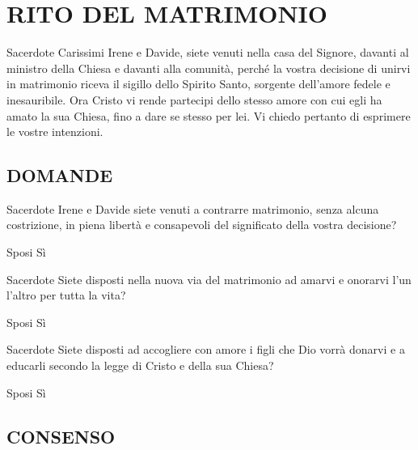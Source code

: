 
\section*{RITO DEL MATRIMONIO}

\begin{dialoghi}
\item[Sacerdote] Carissimi Irene e Davide, siete venuti nella casa del Signore, davanti al ministro della Chiesa e davanti alla comunità, perché la vostra decisione di unirvi in matrimonio riceva il sigillo dello Spirito Santo, sorgente dell'amore fedele e inesauribile. Ora Cristo vi rende partecipi dello stesso amore con cui egli ha amato la sua Chiesa, fino a dare se stesso per lei. Vi chiedo pertanto di esprimere le vostre intenzioni.
\end{dialoghi}

\subsection*{DOMANDE}

\begin{dialoghi}
\item[Sacerdote] Irene e Davide siete venuti a contrarre matrimonio, senza alcuna costrizione, in piena libertà e consapevoli del significato della vostra decisione?
\item[Sposi] Sì
\item[Sacerdote] Siete disposti nella nuova via del matrimonio ad amarvi e onorarvi l'un l'altro per tutta la vita?
\item[Sposi] Sì
\item[Sacerdote] Siete disposti ad accogliere con amore i figli che Dio vorrà donarvi e a educarli secondo la legge di Cristo e della sua Chiesa?
\item[Sposi] Sì
\end{dialoghi}

\subsection*{CONSENSO}


